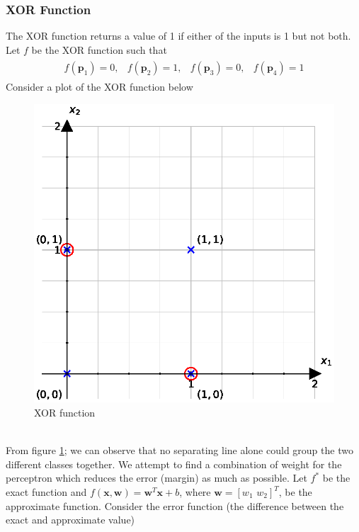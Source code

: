 \subsubsection*{XOR Function}
The XOR function returns a value of 1 if either of the inputs is 1 but not both. Let $f$ be the XOR function such that
\begin{align}
  \begin{matrix}
    f(\textbf{p}_1)=0,&   f(\textbf{p}_2)=1 ,& f(\textbf{p}_3)=0,&   f(\textbf{p}_4)=1
    \label{eq:XOR_function}    
  \end{matrix}
\end{align}
Consider a plot of the XOR function below 
\begin{figure}[ht]
  \centering
  \includegraphics[scale=0.75]{CHAPTER_2/c2_rig_XOR_python.eps}
  \caption{XOR function}
  \label{XOR_function}
\end{figure}\\
From figure \ref{XOR_function}; we can observe that no separating line alone could group the two different classes together. We attempt to find a combination of weight for the perceptron which reduces the error (margin) as much as possible. Let $f^{*}$ be the exact function and $f(\textbf{x},\textbf{w}) = \textbf{w}^T\textbf{x} + b$, where $\textbf{w} = [w_1 \, \, w_2]^T$, be the approximate function. Consider the error function (the difference between the exact and approximate value)
